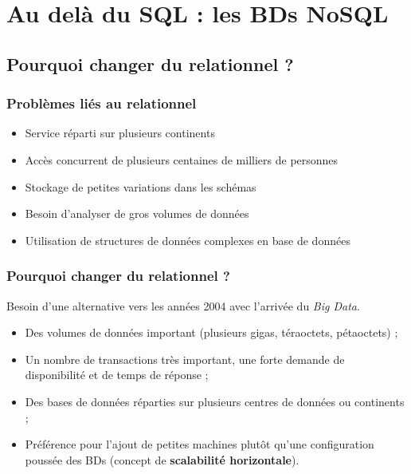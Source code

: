 \section{Au delà du SQL : les BDs NoSQL}

	\subsection{Pourquoi changer du relationnel ?}
	\begin{frame}
		\frametitle{Problèmes liés au relationnel}

		\begin{itemize}
			\item Service réparti sur plusieurs continents
			\item Accès concurrent de plusieurs centaines de milliers de personnes
			\item Stockage de petites variations dans les schémas
			\item Besoin d'analyser de gros volumes de données
			\item Utilisation de structures de données complexes en base de données
		\end{itemize}

	\end{frame}

	\begin{frame}
		\frametitle{Pourquoi changer du relationnel ?}

		Besoin d'une alternative vers les années 2004 avec l'arrivée du \textit{Big Data}.
		\begin{itemize}
			\item Des volumes de données important (plusieurs gigas, téraoctets, pétaoctets) ;
			\item Un nombre de transactions très important, une forte demande de disponibilité et de temps de réponse ;
			\item Des bases de données réparties sur plusieurs centres de données ou continents ;
			\item Préférence pour l'ajout de petites machines plutôt qu'une configuration poussée des BDs (concept de \textbf{scalabilité horizontale}).
		\end{itemize}

	\end{frame}

